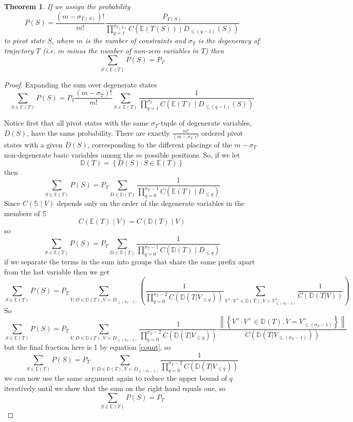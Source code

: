 \documentclass{article}
\newtheorem{theorem}{Theorem}
\begin{document}
\begin{theorem}
If we assign the probability
\[
P(S) =  \frac{(m-\sigma_{T(S)})!}{m!} \frac{P_{T(S)}}{\prod_{q=1}^{\sigma_{T(S)}} C(\mathbb{E}(T(S)) \mid D_{\le (q-1)}(S))}
\]
to pivot state $S$, where $m$ is the number of constraints and $\sigma_{T}$ is the degeneracy of trajectory $T$ (i.e. $m$ minus the number of non-zero variables in $T$) then
\[
\sum_{S \in \mathbb{E}(T)} P(S) = P_{T}
\]
\end{theorem}
\begin{proof}
Expanding the sum over degenerate states
\[
\sum_{S \in \mathbb{E}(T)} P(S) =
P_T \frac{(m-\sigma_T)!}{m!} \sum_{S \in \mathbb{E}(T)} \frac{1}{\prod_{q=1}^{\sigma_T} C(\mathbb{E}(T) \mid D_{\le (q-1)}(S))}
\]

Notice first that all pivot states with the same $\sigma_T$-tuple of degenerate variables, $D(S)$, have the same probability. There are exactly $\frac{m!}{(m-\sigma_T)!}$ ordered pivot states with a given $D(S)$, corresponding to the different placings of the $m-\sigma_T$ non-degenerate basic variables among the $m$ possible positions. So, if we let
\[
\mathbb{D}(T) = \left\{ D(S) : S \in \mathbb{E}(T) \right\}
\]
then
\[
\sum_{S \in \mathbb{E}(T)} P(S) = P_T \sum_{D \in \mathbb{D}(T)} \frac{1}{\prod_{q=0}^{\sigma_T-1} C(\mathbb{E}(T) \mid D_{\le q})}
\]
Since $C(\mathbb{S} \mid V)$ depends only on the order of the degenerate variables in the members of $\mathbb{S}$
\[
C(\mathbb{E}(T) \mid V) = C(\mathbb{D}(T) \mid V)
\]
so
\begin{equation}
\sum_{S \in \mathbb{E}(T)} P(S) = P_T \sum_{D \in \mathbb{D}(T)} \frac{1}{\prod_{q=0}^{\sigma_T-1} C(\mathbb{D}(T) \mid D_{\le q})}
\label{normalForm}
\end{equation}
if we separate the terms in the sum into groups that share the same prefix apart from the last variable then we get
\[
\sum_{S \in \mathbb{E}(T)} P(S) = 
P_T \sum_{V : D \in \mathbb{D}(T), V = D_{\le (\sigma_T-1)}} 
\left(
\frac{1}{\prod_{q=0}^{\sigma_T-2} C(\mathbb{D}(T|V_{\le q}))}
\sum_{V^+: V^+ \in \mathbb{D}(T), V = V^+_{\le (\sigma_T-1)}}
\frac{1}{C(\mathbb{D}(T|V))}
\right)
\]
So
\[
\sum_{S \in \mathbb{E}(T)} P(S) = 
P_T \sum_{V : D \in \mathbb{D}(T), V = D_{\le (\sigma_T-1)}} 
\frac{1}{\prod_{q=0}^{\sigma_T-2} C(\mathbb{D}(T|V_{\le q}))}
\frac{\left\|\left\{V^+: V^+ \in \mathbb{D}(T), V = V^+_{\le (\sigma_T-1)}\right\}\right\|}{C(\mathbb{D}(T|V_{\le (\sigma_T-1)}))}
\]
but the final fraction here is 1 by equation \ref{count}, so
\[
\sum_{S \in \mathbb{E}(T)} P(S) = 
P_T \sum_{V : D \in \mathbb{D}(T), V = D_{\le (\sigma_T-1)}} 
\frac{1}{\prod_{q=0}^{\sigma_T-2} C(\mathbb{D}(T|V_{\le q}))}
\]
we can now use the same argument again to reduce the upper bound of $q$ iteratively until we show that the sum on the right hand equals one, so
\[
\sum_{S \in \mathbb{E}(T)} P(S) = P_T
\]
\end{proof}
\end{document}
